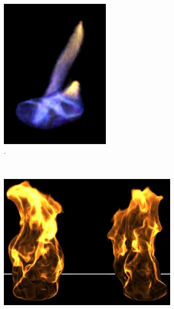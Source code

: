 \begin{figure}[htpb!]
\begin{subfigure}[t]{0.21\textwidth}
                \includegraphics[width=\textwidth]{img/ihrke_2004}
                \caption{\cite{Ihrke:2004}.}
        \end{subfigure}      
        ~ %
        \begin{subfigure}[t]{0.38\textwidth}
                \includegraphics[width=\textwidth]{img/zhang_2011}

\end{subfigure}
\end{figure}

